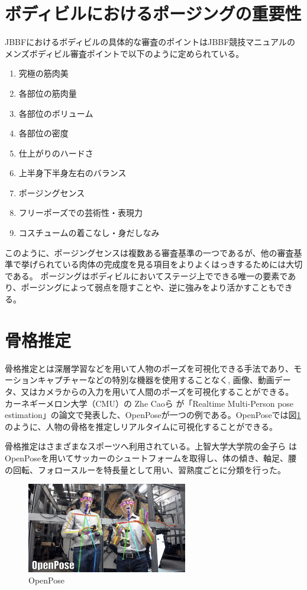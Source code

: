 \section{ボディビルにおけるポージングの重要性}
JBBFにおけるボディビルの具体的な審査のポイントはJBBF競技マニュアルのメンズボディビル審査ポイントで以下のように定められている\cite{JBBF2023}。

\begin{enumerate}
  \item 究極の筋肉美
  \item 各部位の筋肉量
  \item 各部位のボリューム
  \item 各部位の密度
  \item 仕上がりのハードさ
  \item 上半身下半身左右のバランス
  \item ポージングセンス
  \item フリーポーズでの芸術性・表現力
  \item コスチュームの着こなし・身だしなみ
\end{enumerate}
このように、ポージングセンスは複数ある審査基準の一つであるが、他の審査基準で挙げられている肉体の完成度を見る項目をよりよくはっきするためには大切である。
ポージングはボディビルにおいてステージ上でできる唯一の要素であり、ポージングによって弱点を隠すことや、逆に強みをより活かすこともできる。


\section{骨格推定}
骨格推定とは深層学習などを用いて人物のポーズを可視化できる手法であり、モーションキャプチャーなどの特別な機器を使用することなく,
画像、動画データ、又はカメラからの入力を用いて人間のポーズを可視化することができる。
カーネギーメロン大学（CMU）の Zhe Caoら が「Realtime Multi-Person pose estimation」\cite{openpose}の論文で発表した、OpenPoseが一つの例である。OpenPoseでは図\ref{fig:openpose}のように、人物の骨格を推定しリアルタイムに可視化することができる。


骨格推定はさまざまなスポーツへ利用されている。上智大学大学院の金子ら \cite{soccer_openpose}はOpenPoseを用いてサッカーのシュートフォームを取得し、体の傾き、軸足、腰の回転、フォロースルーを特長量として用い、習熟度ごとに分類を行った。
\begin{figure}[htbp]
    \begin{center}
        \includegraphics[width=7cm]{figures/openpose.png}
        \caption{OpenPose}
        \label{fig:openpose}
    \end{center}
  \end{figure}
